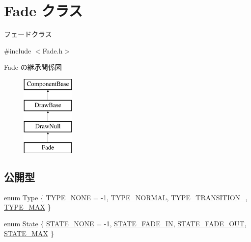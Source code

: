 \hypertarget{class_fade}{}\section{Fade クラス}
\label{class_fade}


フェードクラス  




{\ttfamily \#include $<$Fade.\+h$>$}

Fade の継承関係図\begin{figure}[H]
\begin{center}
\leavevmode
\includegraphics[height=4.000000cm]{class_fade}
\end{center}
\end{figure}
\subsection*{公開型}
\begin{DoxyCompactItemize}
\item 
enum \mbox{\hyperlink{class_fade_ac06f27215b454aa05b93c236476d6e80}{Type}} \{ \mbox{\hyperlink{class_fade_ac06f27215b454aa05b93c236476d6e80aff416f0a20b074a38a4f67e20f001828}{T\+Y\+P\+E\+\_\+\+N\+O\+NE}} = -\/1, 
\mbox{\hyperlink{class_fade_ac06f27215b454aa05b93c236476d6e80a6058f5db637853756ba18166da96043e}{T\+Y\+P\+E\+\_\+\+N\+O\+R\+M\+AL}}, 
\mbox{\hyperlink{class_fade_ac06f27215b454aa05b93c236476d6e80af424897abd4b53f7af0bf51f1190a427}{T\+Y\+P\+E\+\_\+\+T\+R\+A\+N\+S\+I\+T\+I\+O\+N\+\_}}, 
\mbox{\hyperlink{class_fade_ac06f27215b454aa05b93c236476d6e80ab05e3987a6b16a8ebe7e284aa8922ea0}{T\+Y\+P\+E\+\_\+\+M\+AX}}
 \}
\item 
enum \mbox{\hyperlink{class_fade_ae77826bf3ff2ab95fb7b3b6f95cba80a}{State}} \{ \mbox{\hyperlink{class_fade_ae77826bf3ff2ab95fb7b3b6f95cba80aae593109007af793c6b0e7e287dcc7803}{S\+T\+A\+T\+E\+\_\+\+N\+O\+NE}} = -\/1, 
\mbox{\hyperlink{class_fade_ae77826bf3ff2ab95fb7b3b6f95cba80aa5b9862985db043392d465dd7a7a7805b}{S\+T\+A\+T\+E\+\_\+\+F\+A\+D\+E\+\_\+\+IN}}, 
\mbox{\hyperlink{class_fade_ae77826bf3ff2ab95fb7b3b6f95cba80aa41e3fdc3eb47279527440d923fccbb6e}{S\+T\+A\+T\+E\+\_\+\+F\+A\+D\+E\+\_\+\+O\+UT}}, 
\mbox{\hyperlink{class_fade_ae77826bf3ff2ab95fb7b3b6f95cba80aab65dcff35c00997ef90c43d254906121}{S\+T\+A\+T\+E\+\_\+\+M\+AX}}
 \}
\end{DoxyCompactItemize}

